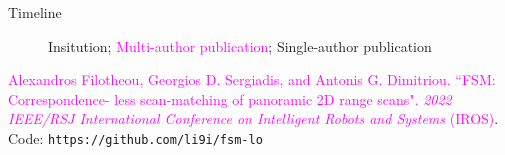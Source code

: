 \begin{frame}{Timeline}

\begin{figure}[t!] \centering
        
        \caption{\textcolor[RGB]{32,74,135}{Insitution}; \textcolor{magenta}{Multi-author publication}; \textcolor[RGB]{78,154,0}{Single-author publication}}
\end{figure}

\placebottom \tiny
\textcolor{magenta}{Alexandros Filotheou, Georgios D. Sergiadis, and Antonis G. Dimitriou. ``FSM: Correspondence-
  less scan-matching of panoramic 2D range scans". \textit{2022 IEEE/RSJ International Conference on Intelligent Robots and Systems} (IROS)}. Code: \texttt{https://github.com/li9i/fsm-lo}

\end{frame}
